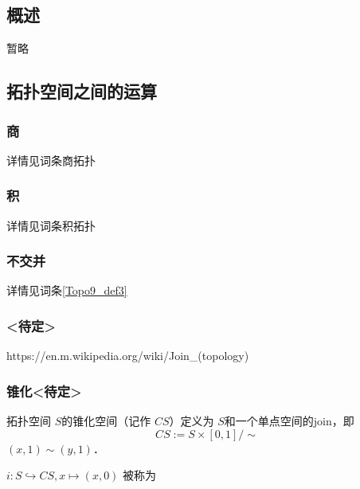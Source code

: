 
\begin{issues}
\issueDraft
\issueTODO
\issueMissDepend
\issueAbstract
\issueNeedCite
\end{issues}

\subsection{概述}

暂略

\subsection{拓扑空间之间的运算}

\subsubsection{商}

详情见词条商拓扑


\subsubsection{积}

详情见词条积拓扑


\subsubsection{不交并}

详情见词条\autoref{Topo9_def3}~


\subsubsection{<待定>}

https://en.m.wikipedia.org/wiki/Join_(topology)


\subsubsection{锥化<待定>}

\begin{definition}{}
拓扑空间 $S$的锥化空间（记作 $C S$）定义为 $S$和一个单点空间的join，即
\[
    C S := S \times [0,1] / \sim
\]
$(x, 1) \sim (y, 1)$．

$i: S \hookrightarrow C S, x \mapsto (x, 0)$ 被称为
\end{definition}

